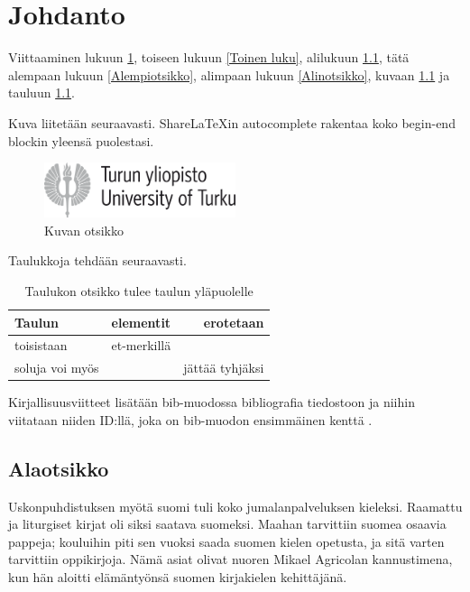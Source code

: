 \chapter{Johdanto} \label{Johdanto}

Viittaaminen lukuun \ref{Johdanto}, toiseen lukuun \ref{Toinen luku},
alilukuun \ref{Alaotsikko}, tätä alempaan lukuun \ref{Alempiotsikko},
alimpaan lukuun \ref{Alinotsikko}, kuvaan \ref{Kuva esimerkki} ja
tauluun \ref{Taulu esimerkki}.

Kuva liitetään seuraavasti. ShareLaTeXin autocomplete rakentaa koko
begin-end blockin yleensä puolestasi.

\begin{figure}
\centering \includegraphics[width=0.5\textwidth]{kuvat/turun_yliopisto_logo_rgb}
\caption{Kuvan otsikko}
\label{Kuva esimerkki} 
\end{figure}

Taulukkoja tehdään seuraavasti.

\begin{table}
\centering \caption{Taulukon otsikko tulee taulun yläpuolelle}
\begin{tabular}{l|c|r|}
Taulun  & elementit  & erotetaan \tabularnewline
\hline 
toisistaan  & et-merkillä  & \tabularnewline
soluja voi myös  &  & jättää tyhjäksi \tabularnewline
\end{tabular}\label{Taulu esimerkki} 
\end{table}

Kirjallisuusviitteet lisätään bib-muodossa bibliografia tiedostoon
ja niihin viitataan niiden ID:llä, joka on bib-muodon ensimmäinen
kenttä \cite{crawley2007write}.

\section{Alaotsikko}

\label{Alaotsikko}

Uskonpuhdistuksen myötä suomi tuli koko jumalanpalveluksen kieleksi.
Raamattu ja liturgiset kirjat oli siksi saatava suomeksi. Maahan tarvittiin
suomea osaavia pappeja; kouluihin piti sen vuoksi saada suomen kielen
opetusta, ja sitä varten tarvittiin oppikirjoja. Nämä asiat olivat
nuoren Mikael Agricolan kannustimena, kun hän aloitti elämäntyönsä
suomen kirjakielen kehittäjänä.

